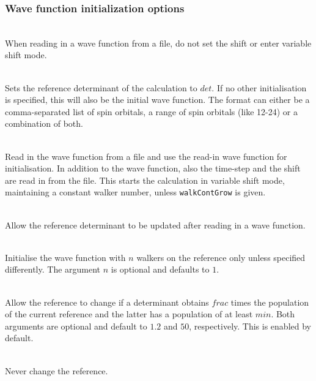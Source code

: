 \documentclass[a4paper,notitlepage]{scrreprt}
\newcommand\codeitem[1]{\needspace{1.5\baselineskip}\item[\textnormal{\ttfamily #1 \nopagebreak}] \hfill \\ \nopagebreak}
\begin{document}
  \subsubsection{Wave function initialization options}
  \begin{description}
    \codeitem{\textcolor{oblue}{walkContGrow}}
    When reading in a wave function from a file, do not set the shift or enter
    variable shift mode.    
    \codeitem{\textcolor{oblue}{defineDet $det$}}
    Sets the reference determinant of the calculation to $det$. If no other
    initialisation is specified, this will also be the initial
    wave function. The format can either be a comma-separated list of spin
    orbitals, a range of spin orbitals (like 12-24) or a combination of both.    
    \codeitem{readPops}
    Read in the wave function from a file and use the read-in wave function
    for initialisation. In addition to the wave function, also the time-step
    and the shift are read in from the file. This starts the calculation in
    variable shift mode, maintaining a constant walker number, unless
    \texttt{walkContGrow} is given.
    \codeitem{readpops-changeref}
    Allow the reference determinant to be updated after reading in a
    wave function.
    \codeitem{startSinglePart $n$}
    Initialise the wave function with $n$ walkers on the reference only unless
    specified differently. The argument $n$ is optional and defaults to $1$.
    \codeitem{proje-changeRef $frac$ $min$}
    Allow the reference to change if a determinant obtains $frac$ times the
    population of the current reference and the latter has a population of at
    least $min$. Both arguments are optional and default to $1.2$ and $50$,
    respectively. This is enabled by default.
    \codeitem{no-changeref}
    Never change the reference.
  \end{description}
\end{document}
